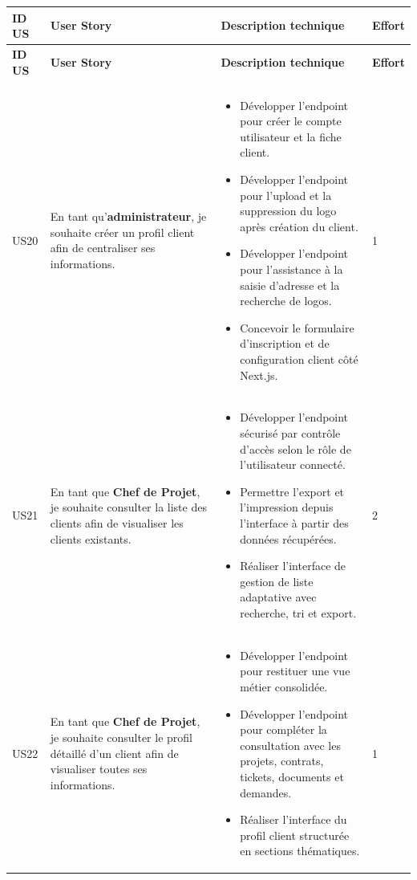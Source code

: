 ﻿
\renewcommand{\arraystretch}{1.3}
\small
\begin{longtable}{|C{1cm}|L{5.6cm}|L{8cm}|C{0.85cm}|}
\hline
\textbf{ID US} & \textbf{User Story} & \textbf{Description technique} & \textbf{Effort} \\
\hline
\endfirsthead

\hline
\textbf{ID US} & \textbf{User Story} & \textbf{Description technique} & \textbf{Effort} \\
\hline
\endhead

\hline
\endfoot

\hline
\endlastfoot

 \\
\hline

US20 & En tant qu'\textbf{administrateur}, je souhaite créer un profil client afin de centraliser ses informations. &
\begin{itemize}[nosep, left=0pt, label={$\bullet$}]
\item Développer l'endpoint pour créer le compte utilisateur et la fiche client.
\item Développer l'endpoint pour l'upload et la suppression du logo après création du client.
\item Développer l'endpoint pour l'assistance à la saisie d'adresse et la recherche de logos.
\item Concevoir le formulaire d'inscription et de configuration client côté Next.js.
\end{itemize} & 1 \\
\hline

US21 & En tant que \textbf{Chef de Projet}, je souhaite consulter la liste des clients afin de visualiser les clients existants. &
\begin{itemize}[nosep, left=0pt, label={$\bullet$}]
\item Développer l'endpoint sécurisé par contrôle d'accès selon le rôle de l'utilisateur connecté.
\item Permettre l'export et l'impression depuis l'interface à partir des données récupérées.
\item Réaliser l'interface de gestion de liste adaptative avec recherche, tri et export.
\end{itemize} & 2 \\
\hline

US22 & En tant que \textbf{Chef de Projet}, je souhaite consulter le profil détaillé d'un client afin de visualiser toutes ses informations. &
\begin{itemize}[nosep, left=0pt, label={$\bullet$}]
\item Développer l'endpoint pour restituer une vue métier consolidée.
\item Développer l'endpoint pour compléter la consultation avec les projets, contrats, tickets, documents et demandes.
\item Réaliser l'interface du profil client structurée en sections thématiques.
\end{itemize} & 1 \\
\hline


\end{longtable}
